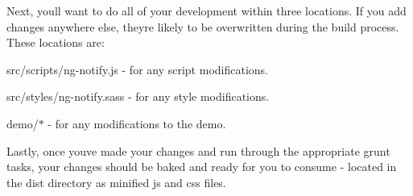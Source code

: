 Next, you\textquotesingle{}ll want to do all of your development within three locations. If you add changes anywhere else, they\textquotesingle{}re likely to be overwritten during the build process. These locations are\+:

{\ttfamily src/scripts/ng-\/notify.\+js} -\/ for any script modifications.

{\ttfamily src/styles/ng-\/notify.\+sass} -\/ for any style modifications.

{\ttfamily demo/$\ast$} -\/ for any modifications to the demo.

Lastly, once you\textquotesingle{}ve made your changes and run through the appropriate grunt tasks, your changes should be baked and ready for you to consume -\/ located in the {\ttfamily dist} directory as minified js and css files. 